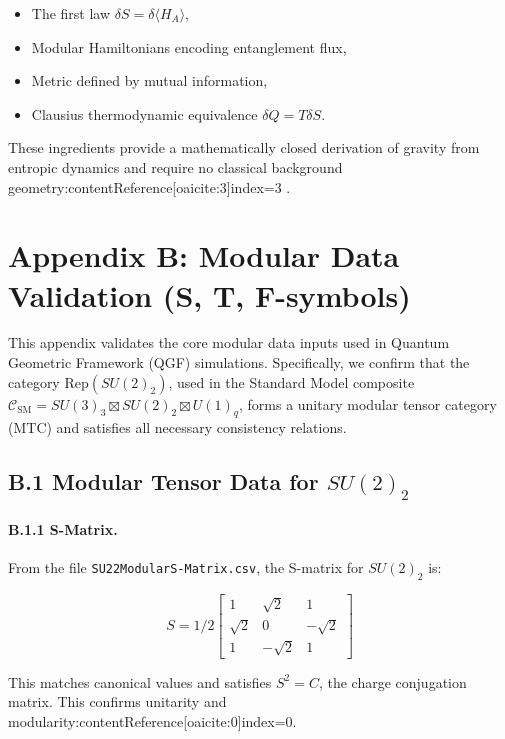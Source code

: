 \documentclass[11pt]{article}
\def\_{}
\def\frac#1#2{#1/#2}
\begin{document}
\begin{itemize}
  \item The first law \( \delta S = \delta \langle H_A \rangle \),
  \item Modular Hamiltonians encoding entanglement flux,
  \item Metric defined by mutual information,
  \item Clausius thermodynamic equivalence \( \delta Q = T \delta S \).
\end{itemize}

These ingredients provide a mathematically closed derivation of gravity from entropic dynamics and require no classical background geometry:contentReference[oaicite:3]{index=3} .


\section*{Appendix B: Modular Data Validation (S, T, F-symbols)}

This appendix validates the core modular data inputs used in Quantum Geometric Framework (QGF) simulations. Specifically, we confirm that the category \( \text{Rep}(SU(2)_2) \), used in the Standard Model composite \( \mathcal{C}_{\text{SM}} = SU(3)_3 \boxtimes SU(2)_2 \boxtimes U(1)_q \), forms a unitary modular tensor category (MTC) and satisfies all necessary consistency relations.

\subsection*{B.1 Modular Tensor Data for \( SU(2)_2 \)}

\paragraph{B.1.1 S-Matrix.}  
From the file \texttt{SU\_2\_\_2\_Modular\_S-Matrix.csv}, the S-matrix for \( SU(2)_2 \) is:

\[
S = \frac{1}{2} \begin{bmatrix}
1 & \sqrt{2} & 1 \\
\sqrt{2} & 0 & -\sqrt{2} \\
1 & -\sqrt{2} & 1
\end{bmatrix}
\]

This matches canonical values and satisfies \( S^2 = C \), the charge conjugation matrix. This confirms unitarity and modularity:contentReference[oaicite:0]{index=0}.
\end{document}
